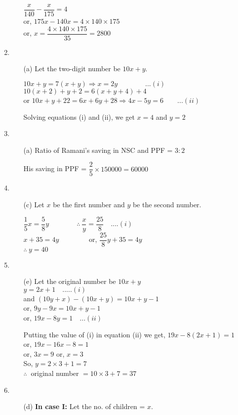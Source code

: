 \begin{multicols}{2}
\begin{enumerate}
\begin{itemize}
    $\dfrac{x}{140} - \dfrac{x}{175} = 4$\\
    or, $175x - 140x = 4 \times 140 \times 175$\\
    or, $x = \dfrac{4 \times 140 \times 175}{35} = 2800$
  \end{itemize}
\item
  \begin{itemize}
  \item[(a)] Let the two-digit number be $10x + y$.

    $10x + y = 7(x + y) \Rightarrow x = 2y \qquad\qquad ...(i)$\\
    $10(x + 2) + y + 2 = 6(x + y + 4) + 4$\\
    or $10x + y + 22 = 6x + 6y + 28 \Rightarrow 4x - 5y = 6 \qquad  ...(ii)$

    Solving equations (i) and (ii), we get $x = 4$ and $y = 2$
  \end{itemize}
\item
  \begin{itemize}
  \item[(a)] Ratio of Ramani's saving in NSC and PPF = $3 : 2$

    His saving in PPF = $\dfrac{2}{5} \times 150000 = 60000$
  \end{itemize}
\item
  \begin{itemize}
  \item[(c)] Let $x$ be the first number and $y$ be the second number.

    $\dfrac{1}{5}x = \dfrac{5}{8}y \qquad\qquad \therefore~ \dfrac{x}{y} = \dfrac{25}{8} \quad ....(i)$\\
    $x + 35 = 4y \qquad\qquad$ or, $\dfrac{25}{8}y + 35 = 4y$\\
    $\therefore~ y = 40$
  \end{itemize}
\item
  \begin{itemize}
  \item[(e)] Let the original number be $10 x + y$\\
    $y = 2x + 1 \quad .....(i)$\\
    and $(10y + x) - (10x + y) = 10x + y - 1$\\
    or, $9y - 9x = 10x + y - 1$\\
    or, $19x - 8y = 1 \quad ...(ii)$

    Putting the value of (i) in equation (ii) we get,
    $19x - 8 (2x + 1) = 1$\\
    or, $19x - 16x - 8 = 1$\\
    or, $3x = 9$ or, $x = 3$\\
    So, $y = 2 \times 3 + 1 = 7$\\
    $\therefore~$ original number $= 10 \times 3 + 7 = 37$
  \end{itemize}
\item
  \begin{itemize}
  \item[(d)] \textbf{In case I:} Let the no. of children = $x$.


\end{itemize}
\end{enumerate}
\end{multicols}
